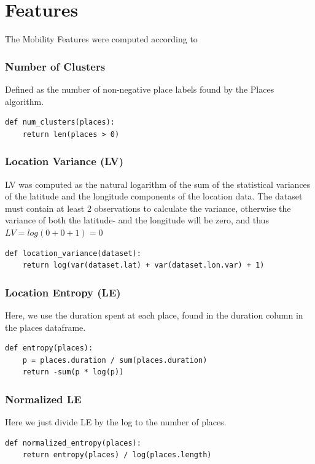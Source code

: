 \section{Features}
The Mobility Features were computed according to 

\subsubsection{Number of Clusters}
Defined as the number of non-negative place labels found by the Places algorithm.

\begin{verbatim}
def num_clusters(places):
    return len(places > 0)
\end{verbatim}

\subsubsection{Location Variance (LV)} 
LV was computed as the natural logarithm of the sum of the statistical variances of the latitude and the longitude components of the location data. The dataset must contain at least 2 observations to calculate the variance, otherwise the variance of both the latitude- and the longitude will be zero, and thus $LV = log(0 + 0 + 1)  = 0$

\begin{verbatim}
def location_variance(dataset):
    return log(var(dataset.lat) + var(dataset.lon.var) + 1)
\end{verbatim}

\subsubsection{Location Entropy (LE)} 
Here, we use the duration spent at each place, found in the duration column in the places dataframe.

\begin{verbatim}
def entropy(places):
    p = places.duration / sum(places.duration)
    return -sum(p * log(p))
\end{verbatim}

\subsubsection{Normalized LE} 
Here we just divide LE by the log to the number of places.

\begin{verbatim}
def normalized_entropy(places):
    return entropy(places) / log(places.length)
\end{verbatim}

